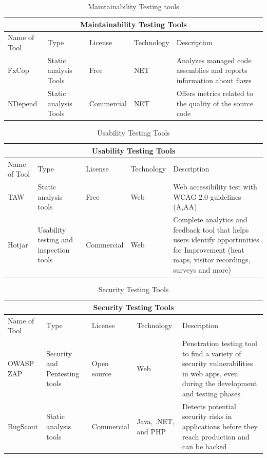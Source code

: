 \documentclass[journal, onecolumn]{IEEEtran}
\begin{document}
	
	\begin{table}[h]
		\centering
		\begin{tabular}{|p{1cm}||p{1.5cm}|p{1.5cm}|p{1.25cm}|p{3cm}|}
			\hline
			\multicolumn{5}{|c|}{Maintainability Testing Tools} \\
			\hline
			Name of Tool & Type & License & Technology &Description\\
			\hline
			FxCop  & Static analysis Tools  & Free & NET &   Analyzes managed code assemblies and reports information about flaws \\
			\hline
			NDepend & Static analysis Tools &  Commercial  & NET  &Offers metrics related to the quality of the source code\\
			\hline
		\end{tabular}
		\caption{Maintainability Testing tools}
	\end{table}
	
	\pagebreak 
	
	\begin{table}
		\centering
		\begin{tabular}{|p{1cm}||p{1.5cm}|p{1.5cm}|p{1.25cm}|p{3cm}|}
			\hline
			\multicolumn{5}{|c|}{Usability Testing Tools} \\
			\hline
			Name of Tool & Type & License & Technology &Description\\
			\hline
			TAW  & Static analysis tools  & Free & Web &   Web accessibility test with WCAG 2.0 guidelines (A,AA)\\
			\hline
			Hotjar & Usability testing and inspection tools &  Commercial  & Web  &Complete analytics and feedback tool that helps users identify opportunities for Improvement (heat maps, visitor recordings, surveys and more)\\
			\hline
		\end{tabular}
		\caption{Usability Testing Tools}
	\end{table}
	
	
	\begin{table}
		\centering
		\begin{tabular}{|p{1cm}||p{1.5cm}|p{1.5cm}|p{1.25cm}|p{3cm}|}
			\hline
			\multicolumn{5}{|c|}{Security Testing Tools} \\
			\hline
			Name of Tool & Type & License & Technology &Description\\
			\hline
			OWASP ZAP  & Security and Pentesting tools  & Open source & Web &   Penetration testing tool to find a variety of security vulnerabilities in
			web apps, even during the development and testing phases\\
			\hline
			BugScout & Static analysis tools &  Commercial  & Java, .NET, and PHP  &Detects potential security risks in applications before they reach production and can be hacked\\
			\hline
		\end{tabular}
		\caption{Security Testing Tools}
	\end{table}
	
\end{document}
